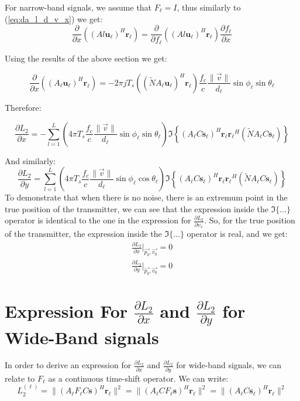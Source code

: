 \documentclass[10pt,a4paper]{report}
\begin{document}
For narrow-band signals, we assume that $F_\ell = I$, thus similarly to (\ref{eq:da_l_d_v_x}) we get:
\begin{equation}
\frac{\partial}{\partial x}\left( (Al \mathbf{u_\ell})^H \mathbf{r_\ell}\right) = \frac{\partial}{\partial f_\ell}\left( (Al \mathbf{u_\ell})^H \mathbf{r_\ell}\right) \frac{\partial f_\ell}{\partial x}
\end{equation}

Using the results of the above section we get:

\begin{equation}
\frac{\partial}{\partial x}((A_\ell \mathbf{u_\ell})^H \mathbf{r_\ell}) = - 2 \pi j T_s ((\tilde{N} A_\ell \mathbf{u_\ell})^H\mathbf{r_\ell})\frac{f_c}{c}\frac{\|\vec{v}\|}{d_\ell} \sin \phi_\ell \sin \theta_\ell
\end{equation}

Therefore:

\begin{equation}
\frac{\partial L_2}{\partial x} = -\sum_{l=1}^L (4 \pi T_s \frac{f_c}{c}\frac{\|\vec{v}\|}{d_\ell}\sin \phi_\ell \sin \theta_\ell ) \Im
\left\{
(A_\ell C \mathbf{s_\ell})^H \mathbf{r_\ell}\mathbf{r_\ell}^H (\tilde{N}A_\ell C \mathbf{s_\ell})
\right\}
\end{equation}

And similarly:
\begin{equation}
\frac{\partial L_2}{\partial y} = \sum_{l=1}^L (4 \pi T_s \frac{f_c}{c}\frac{\|\vec{v}\|}{d_\ell}\sin \phi_\ell \cos \theta_\ell ) \Im
\left\{
(A_\ell C \mathbf{s_\ell})^H \mathbf{r_\ell}\mathbf{r_\ell}^H (\tilde{N}A_\ell C \mathbf{s_\ell})
\right\}
\end{equation}
To demonstrate that when there is no noise, there is an extremum point in the true position of the transmitter, we can see that the expression inside the $\Im\{\dots\}$ operator is identical to the one in the expression for $\frac{\partial L_2}{\partial v_x}$. So, for the true position of the transmitter, the
expression inside the $\Im\{\dots\}$ operator is real, and we get:
\begin{eqnarray}
\frac{\partial L_2}{\partial x}|_{\vec{p_0},\vec{v_0}} = 0 \\
\frac{\partial L_2}{\partial y}|_{\vec{p_0},\vec{v_0}}= 0 \nonumber
\end{eqnarray}

\section{Expression For $\frac{\partial L_2}{\partial x}$ and $\frac{\partial L_2}{\partial y}$ for Wide-Band signals}
\label{d_L2_dx_dy_WB}
In order to derive an expression for $\frac{\partial L_2}{\partial x}$ and $\frac{\partial L_2}{\partial y}$ for wide-band signals, we can relate to $F_\ell$ as a continuous time-shift operator.
We can write:
\begin{equation}
L_2^{(\ell)}=\|(A_\ell F_\ell C\mathbf{s})^H\mathbf{r_\ell}\|^2 = \|(A_\ell C F_\ell \mathbf{s})^H\mathbf{r_\ell}\|^2= \|(A_\ell C \mathbf{s_\ell})^H\mathbf{r_\ell}\|^2
\end{equation}
\end{document}
